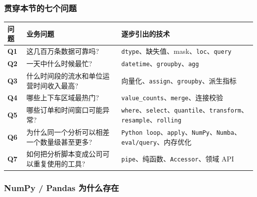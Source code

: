 \documentclass[11pt]{article}
\begin{document}
    \subsubsection{贯穿本节的七个问题}\label{ux8d2fux7a7fux672cux8282ux7684ux4e03ux4e2aux95eeux9898}

    {\def\LTcaptype{none} %
\begin{longtable}[]{@{}
  >{\centering\arraybackslash}p{}
  >{\centering\arraybackslash}p{}
  >{\centering\arraybackslash}p{}@{}}
\toprule\noalign{}
\begin{minipage}[b]{\linewidth}\centering
问题
\end{minipage} & \begin{minipage}[b]{\linewidth}\centering
业务问题
\end{minipage} & \begin{minipage}[b]{\linewidth}\centering
逐步引出的技术
\end{minipage} \\
\midrule\noalign{}
\endhead
\bottomrule\noalign{}
\endlastfoot
\textbf{Q1} & 这几百万条数据可靠吗? &
\texttt{dtype}、缺失值、mask、\texttt{loc}、\texttt{query} \\
\textbf{Q2} & 一天中什么时候最忙? &
\texttt{datetime}、\texttt{groupby}、\texttt{agg} \\
\textbf{Q3} & 什么时间段的流水和单位运营时间收入最高? &
向量化、\texttt{assign}、\texttt{groupby}、派生指标 \\
\textbf{Q4} & 哪些上下车区域最热门? &
\texttt{value\_counts}、\texttt{merge}、连接校验 \\
\textbf{Q5} & 哪些订单和时间窗口可能异常? &
\texttt{where}、\texttt{select}、\texttt{quantile}、\texttt{transform}、\texttt{resample}、\texttt{rolling} \\
\textbf{Q6} & 为什么同一个分析可以相差一个数量级甚至更多? &
\texttt{Python\ loop}、\texttt{apply}、\texttt{NumPy}、\texttt{Numba}、\texttt{eval/query}、内存优化 \\
\textbf{Q7} & 如何把分析脚本变成公司可以重复使用的工具? &
\texttt{pipe}、纯函数、\texttt{Accessor}、领域 API \\
\end{longtable}
}

    \subsubsection{NumPy / Pandas
为什么存在}\label{numpy-pandas-ux4e3aux4ec0ux4e48ux5b58ux5728}
\end{document}
